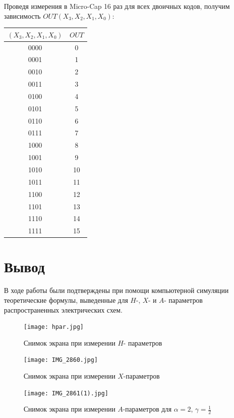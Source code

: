 \documentclass[a4paper, 12pt]{article}
\begin{document}
Проведя измерения в Micro-Cap 16 раз для всех двоичных кодов, получим зависимость
$OUT(X_3, X_2, X_1, X_0)$:
\begin{table}[h]
  \centering
  \begin{tabular}{|c|c|}
    \hline
    $(X_3, X_2, X_1, X_0)$ & $OUT$ \\ \hline
    0000 & 0 \\ \hline
    0001 & 1 \\ \hline
    0010 & 2 \\ \hline
    0011 & 3 \\ \hline
    0100 & 4 \\ \hline
    0101 & 5 \\ \hline
    0110 & 6 \\ \hline
    0111 & 7 \\ \hline
    1000 & 8 \\ \hline
    1001 & 9 \\ \hline
    1010 & 10 \\ \hline
    1011 & 11 \\ \hline
    1100 & 12 \\ \hline
    1101 & 13 \\ \hline
    1110 & 14 \\ \hline
    1111 & 15 \\ \hline
  \end{tabular}
\end{table}

\newpage
\section{Вывод}
В ходе работы были подтверждены при помощи компьютерной симуляции теоретические формулы,
выведенные для $H$-, $X$- и $A$- параметров распространенных электрических схем.

\newpage

\begin{figure}
  \centering
  \texttt{[image: hpar.jpg]}
  \caption{Снимок экрана при измерении $H$- параметров}
  \label{hpar}
\end{figure}

\begin{figure}
  \centering
  \texttt{[image: IMG\_2860.jpg]}
  \caption{Снимок экрана при измерении $X$-параметров}
  \label{xpar}
\end{figure}

\begin{figure}
  \centering
  \texttt{[image: IMG\_2861(1).jpg]}
  \caption{Снимок экрана при измерении $A$-параметров для $\alpha = 2$, $\gamma = \frac{1}{2}$}
\end{figure}
\end{document}
